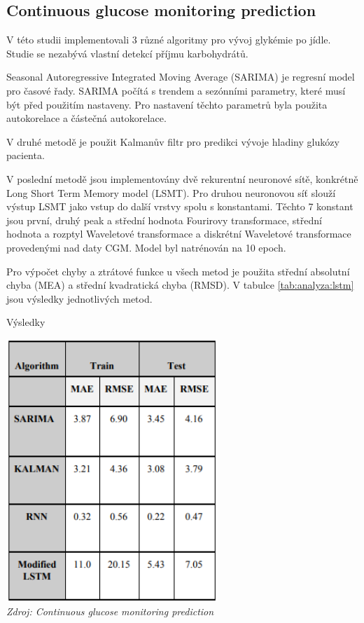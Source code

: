 \subsection{Continuous glucose monitoring prediction}

V této studii \citet{analyzaCHO.LSTM} implementovali 3 různé algoritmy pro vývoj glykémie po jídle. Studie se nezabývá vlastní detekcí příjmu karbohydrátů.

Seasonal Autoregressive Integrated Moving Average (SARIMA) je regresní model pro časové řady. SARIMA počítá s trendem a sezónními parametry, které musí být před použitím nastaveny. Pro nastavení těchto parametrů byla použita autokorelace a částečná autokorelace.

V druhé metodě je použit Kalmanův filtr pro predikci vývoje hladiny glukózy pacienta.

V poslední metodě jsou implementovány dvě rekurentní neuronové sítě, konkrétně Long Short Term Memory model (LSMT). Pro druhou neuronovou síť slouží výstup LSMT jako vstup do další vrstvy spolu s konstantami. Těchto 7 konstant jsou první, druhý peak a střední hodnota Fourirovy transformace, střední hodnota a rozptyl Waveletové transformace a diskrétní Waveletové transformace provedenými nad daty CGM. Model byl natrénován na 10 epoch.

Pro výpočet chyby a ztrátové funkce u všech metod je použita střední absolutní chyba (MEA) a střední kvadratická chyba (RMSD). V tabulce \ref{tab:analyza:lstm} jsou výsledky jednotlivých metod.

\begin{table}[H]
\caption{Výsledky}
\label{tab:analyza:lstm}
\centering
\includegraphics[width=0.6\textwidth]{img/analyzaCHO/lstm.png}\\
\textit{Zdroj: Continuous glucose monitoring prediction \citep{analyzaCHO.LSTM}}
\end{table}


